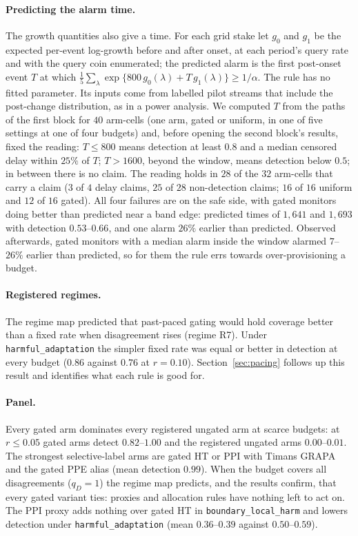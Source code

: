 \paragraph{Predicting the alarm time.}
The growth quantities also give a time. For each grid stake let $g_0$ and $g_1$ be the expected per-event log-growth before and after onset, at each period's query rate and with the query coin enumerated; the predicted alarm is the first post-onset event $T$ at which
$\tfrac15\sum_\lambda \exp\{800\,g_0(\lambda)+T\,g_1(\lambda)\}\ge 1/\alpha$.
The rule has no fitted parameter. Its inputs come from labelled pilot streams that include the post-change distribution, as in a power analysis.
We computed $T$ from the paths of the first block for $40$ arm-cells (one arm, gated or uniform, in one of five settings at one of four budgets) and, before opening the second block's results, fixed the reading:
$T\le800$ means detection at least $0.8$ and a median censored delay within $25\%$ of $T$; $T>1600$, beyond the window, means detection below $0.5$; in between there is no claim.
The reading holds in $28$ of the $32$ arm-cells that carry a claim ($3$ of $4$ delay claims, $25$ of $28$ non-detection claims; $16$ of $16$ uniform and $12$ of $16$ gated).
All four failures are on the safe side, with gated monitors doing better than predicted near a band edge: predicted times of $1{,}641$ and $1{,}693$ with detection $0.53$--$0.66$, and one alarm $26\%$ earlier than predicted.
Observed afterwards, gated monitors with a median alarm inside the window alarmed $7$--$26\%$ earlier than predicted, so for them the rule errs towards over-provisioning a budget.

\paragraph{Registered regimes.}
The regime map predicted that past-paced gating would hold coverage better than a fixed rate when disagreement rises (regime R7). Under \texttt{harmful\_adaptation} the simpler fixed rate was equal or better in detection at every budget
($0.86$ against $0.76$ at $r=0.10$). Section~\ref{sec:pacing} follows up this result and identifies what each rule is good for.

\paragraph{Panel.}
Every gated arm dominates every registered ungated arm at scarce budgets: at $r\le0.05$ gated arms detect $0.82$--$1.00$ and the registered ungated arms $0.00$--$0.01$.
The strongest selective-label arms are gated HT or PPI with Timans GRAPA and the gated PPE alias (mean detection $0.99$).
When the budget covers all disagreements ($q_D=1$) the regime map predicts, and the results confirm, that every gated variant ties: proxies and allocation rules have nothing left to act on.
The PPI proxy adds nothing over gated HT in \texttt{boundary\_local\_harm} and lowers detection under \texttt{harmful\_adaptation} (mean $0.36$--$0.39$ against $0.50$--$0.59$).

